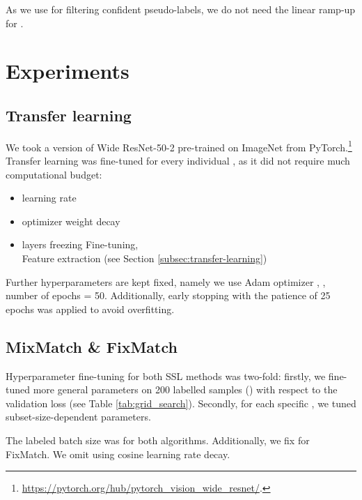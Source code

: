 \documentclass[runningheads]{llncs}
\begin{document}
       
As we use  for filtering confident pseudo-labels, we do not need the linear ramp-up for .

\section{Experiments}
\subsection{Transfer learning} \label{app:transfer-learning}
We took a version of Wide ResNet-50-2 pre-trained on ImageNet from PyTorch.\footnote{\href{https://pytorch.org/hub/pytorch_vision_wide_resnet/}{https://pytorch.org/hub/pytorch\_vision\_wide\_resnet/}.} Transfer learning was fine-tuned for every individual , as it did not require much computational budget: 
\begin{itemize}
    \item learning rate 
    \item optimizer weight decay 
    \item layers freezing Fine-tuning, \\ Feature extraction (see Section \ref{subsec:transfer-learning})
\end{itemize} 

Further hyperparameters are kept fixed, namely  we use Adam optimizer \cite{kingma2014adam}, , number of epochs = 50. Additionally, early stopping with the patience of 25 epochs was applied to avoid overfitting.

\subsection{MixMatch \& FixMatch} \label{app:SSL}

Hyperparameter fine-tuning for both SSL methods was two-fold: firstly, we fine-tuned more general parameters on 200 labelled samples () with respect to the validation loss (see Table \ref{tab:grid_search}). Secondly, for each specific , we tuned subset-size-dependent parameters. 

The labeled batch size was  for both algorithms. Additionally, we fix  for FixMatch. We omit using cosine learning rate decay.  
\end{document}
